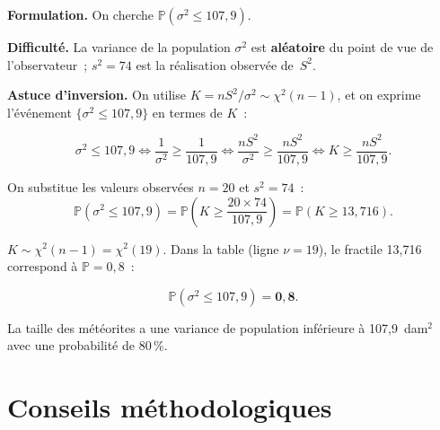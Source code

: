 \documentclass[11pt,a4paper]{article}
\newcommand{\Prob}{\mathbb{P}}
\renewcommand{\P}{\Prob}
\newcommand{\corrsep}{\vspace{4pt}{\color{rulecol}\hrule height 0.6pt}\vspace{6pt}}
\begin{document}
\corrsep

\textbf{Formulation.} On cherche $\P(\sigma^2 \leq 107{,}9)$.

\textbf{Difficult\'e.} La variance de la population $\sigma^2$ est \textbf{al\'eatoire} du point de vue de l'observateur~; $s^2=74$ est la r\'ealisation observ\'ee de~$S^2$.

\textbf{Astuce d'inversion.} On utilise $K = nS^2/\sigma^2 \sim \chi^2(n-1)$, et on exprime l'\'ev\'enement $\{\sigma^2\leq 107{,}9\}$ en termes de $K$~:

$$\sigma^2 \leq 107{,}9
  \iff \frac{1}{\sigma^2} \geq \frac{1}{107{,}9}
  \iff \frac{nS^2}{\sigma^2} \geq \frac{nS^2}{107{,}9}
  \iff K \geq \frac{nS^2}{107{,}9}.$$

On substitue les valeurs observ\'ees $n=20$ et $s^2=74$~:
$$\P(\sigma^2\leq107{,}9) = \P\!\left(K \geq \frac{20\times74}{107{,}9}\right) = \P(K\geq13{,}716).$$

$K\sim\chi^2(n-1)=\chi^2(19)$. Dans la table (ligne $\nu=19$), le fractile 13,716 correspond \`a $\P=0{,}8$~:

$$\P(\sigma^2\leq107{,}9) = \mathbf{0{,}8}.$$

La taille des m\'et\'eorites a une variance de population inf\'erieure \`a 107,9~dam$^2$ avec une probabilit\'e de 80\,\%.

\newpage
\section{Conseils m\'ethodologiques}
\end{document}
